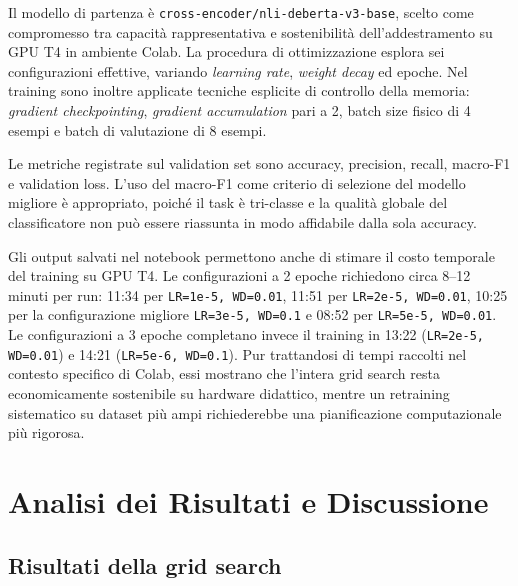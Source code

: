 \documentclass[10pt,a4paper]{article}
\begin{document}
Il modello di partenza è \texttt{cross-encoder/nli-deberta-v3-base}, scelto come compromesso tra capacità rappresentativa e sostenibilità dell'addestramento su GPU T4 in ambiente Colab. La procedura di ottimizzazione esplora sei configurazioni effettive, variando \textit{learning rate}, \textit{weight decay} ed epoche. Nel training sono inoltre applicate tecniche esplicite di controllo della memoria: \textit{gradient checkpointing}, \textit{gradient accumulation} pari a 2, batch size fisico di 4 esempi e batch di valutazione di 8 esempi.

Le metriche registrate sul validation set sono accuracy, precision, recall, macro-F1 e validation loss. L'uso del macro-F1 come criterio di selezione del modello migliore è appropriato, poiché il task è tri-classe e la qualità globale del classificatore non può essere riassunta in modo affidabile dalla sola accuracy.

Gli output salvati nel notebook permettono anche di stimare il costo temporale del training su GPU T4. Le configurazioni a 2 epoche richiedono circa 8--12 minuti per run: 11:34 per \texttt{LR=1e-5, WD=0.01}, 11:51 per \texttt{LR=2e-5, WD=0.01}, 10:25 per la configurazione migliore \texttt{LR=3e-5, WD=0.1} e 08:52 per \texttt{LR=5e-5, WD=0.01}. Le configurazioni a 3 epoche completano invece il training in 13:22 (\texttt{LR=2e-5, WD=0.01}) e 14:21 (\texttt{LR=5e-6, WD=0.1}). Pur trattandosi di tempi raccolti nel contesto specifico di Colab, essi mostrano che l'intera grid search resta economicamente sostenibile su hardware didattico, mentre un retraining sistematico su dataset più ampi richiederebbe una pianificazione computazionale più rigorosa.

\section{Analisi dei Risultati e Discussione}

\subsection{Risultati della grid search}
\end{document}
